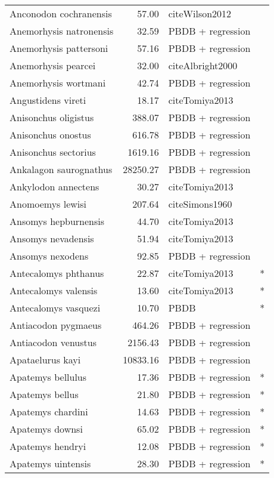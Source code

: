 \begin{table}[ht]
\begin{tabular}{lrll}
  Anconodon cochranensis & 57.00 & cite{Wilson2012} &  \\ 
  Anemorhysis natronensis & 32.59 & PBDB + regression &  \\ 
  Anemorhysis pattersoni & 57.16 & PBDB + regression &  \\ 
  Anemorhysis pearcei & 32.00 & cite{Albright2000} &  \\ 
  Anemorhysis wortmani & 42.74 & PBDB + regression &  \\ 
  Angustidens vireti & 18.17 & cite{Tomiya2013} &  \\ 
  Anisonchus oligistus & 388.07 & PBDB + regression &  \\ 
  Anisonchus onostus & 616.78 & PBDB + regression &  \\ 
  Anisonchus sectorius & 1619.16 & PBDB + regression &  \\ 
  Ankalagon saurognathus & 28250.27 & PBDB + regression &  \\ 
  Ankylodon annectens & 30.27 & cite{Tomiya2013} &  \\ 
  Anomoemys lewisi & 207.64 & cite{Simons1960} &  \\ 
  Ansomys hepburnensis & 44.70 & cite{Tomiya2013} &  \\ 
  Ansomys nevadensis & 51.94 & cite{Tomiya2013} &  \\ 
  Ansomys nexodens & 92.85 & PBDB + regression &  \\ 
  Antecalomys phthanus & 22.87 & cite{Tomiya2013} & * \\ 
  Antecalomys valensis & 13.60 & cite{Tomiya2013} & * \\ 
  Antecalomys vasquezi & 10.70 & PBDB & * \\ 
  Antiacodon pygmaeus & 464.26 & PBDB + regression &  \\ 
  Antiacodon venustus & 2156.43 & PBDB + regression &  \\ 
  Apataelurus kayi & 10833.16 & PBDB + regression &  \\ 
  Apatemys bellulus & 17.36 & PBDB + regression & * \\ 
  Apatemys bellus & 21.80 & PBDB + regression & * \\ 
  Apatemys chardini & 14.63 & PBDB + regression & * \\ 
  Apatemys downsi & 65.02 & PBDB + regression & * \\ 
  Apatemys hendryi & 12.08 & PBDB + regression & * \\ 
  Apatemys uintensis & 28.30 & PBDB + regression & * \\ 

\end{tabular}
\end{table}
